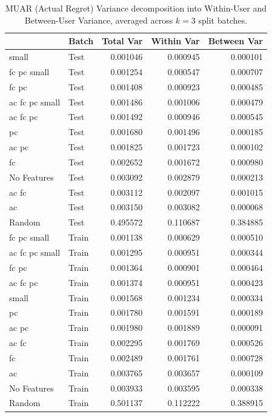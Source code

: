 \begin{table}[H]
\centering
\begin{tabular}{llrrr}
\toprule
           {} &  Batch &  Total Var &  Within Var &  Between Var \\
\midrule
          small &   Test &   0.001046 &    0.000945 &     0.000101 \\
    fc pc small &   Test &   0.001254 &    0.000547 &     0.000707 \\
         fc pc  &   Test &   0.001408 &    0.000923 &     0.000485 \\
 ac fc pc small &   Test &   0.001486 &    0.001006 &     0.000479 \\
      ac fc pc  &   Test &   0.001492 &    0.000946 &     0.000545 \\
            pc  &   Test &   0.001680 &    0.001496 &     0.000185 \\
         ac pc  &   Test &   0.001825 &    0.001723 &     0.000102 \\
            fc  &   Test &   0.002652 &    0.001672 &     0.000980 \\
    No Features &   Test &   0.003092 &    0.002879 &     0.000213 \\
         ac fc  &   Test &   0.003112 &    0.002097 &     0.001015 \\
            ac  &   Test &   0.003150 &    0.003082 &     0.000068 \\
         Random &   Test &   0.495572 &    0.110687 &     0.384885 \\
\midrule
    fc pc small &  Train &   0.001138 &    0.000629 &     0.000510 \\
 ac fc pc small &  Train &   0.001295 &    0.000951 &     0.000344 \\
         fc pc  &  Train &   0.001364 &    0.000901 &     0.000464 \\
      ac fc pc  &  Train &   0.001374 &    0.000951 &     0.000423 \\
          small &  Train &   0.001568 &    0.001234 &     0.000334 \\
            pc  &  Train &   0.001780 &    0.001591 &     0.000189 \\
         ac pc  &  Train &   0.001980 &    0.001889 &     0.000091 \\
         ac fc  &  Train &   0.002295 &    0.001769 &     0.000526 \\
            fc  &  Train &   0.002489 &    0.001761 &     0.000728 \\
            ac  &  Train &   0.003765 &    0.003657 &     0.000109 \\
    No Features &  Train &   0.003933 &    0.003595 &     0.000338 \\
         Random &  Train &   0.501137 &    0.112222 &     0.388915 \\
\bottomrule
\end{tabular}
\caption{MUAR (Actual Regret) Variance decomposition into Within-User and Between-User Variance, averaged across $k = 3$ split batches.}
\label{MUAR Variance Decomposition Table}
\end{table}


